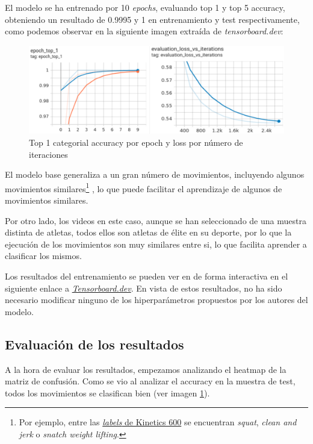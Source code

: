 El modelo se ha entrenado por 10 \textit{epochs}, evaluando top 1 y top 5 accuracy, obteniendo un resultado de 0.9995 y 1 en entrenamiento y test respectivamente, como podemos observar en la siguiente imagen extraída de \textit{tensorboard.dev}:

\begin{figure}[H]
    \centering
		\includegraphics[width=\textwidth]{figs/tensorboard_training.png}
\caption{Top 1 categorial accuracy por epoch y loss por número de iteraciones}\label{training}
\end{figure}

El modelo base generaliza a un gran número de movimientos, incluyendo algunos movimientos similares\footnote{Por ejemplo, entre las  \href{https://raw.githubusercontent.com/tensorflow/models/f8af2291cced43fc9f1d9b41ddbf772ae7b0d7d2/official/projects/movinet/files/kinetics_600_labels.txt}{\textit{labels} de Kinetics 600} se encuentran \textit{squat}, \textit{clean and jerk} o \textit{snatch weight lifting}.} , lo que puede facilitar el aprendizaje de algunos de movimientos similares.

Por otro lado, los videos en este caso, aunque se han seleccionado de una muestra distinta de atletas, todos ellos son atletas de élite en su deporte, por lo que la ejecución de los movimientos son muy similares entre si, lo que facilita aprender a clasificar los mismos.

Los resultados del entrenamiento se pueden ver en de forma interactiva en el siguiente enlace a \href{https://tensorboard.dev/experiment/UXyupsnMQ2S74vdul3vdbw/#scalars}{\textit{Tensorboard.dev}}. En vista de estos resultados, no ha sido necesario modificar ninguno de los hiperparámetros propuestos por los autores del modelo.


\subsection{Evaluación de los resultados}

A la hora de evaluar los resultados, empezamos analizando el heatmap de la matriz de confusión. Como se vio al analizar el accuracy en la muestra de test, todos los movimientos se clasifican bien (ver imagen \ref{training}).

